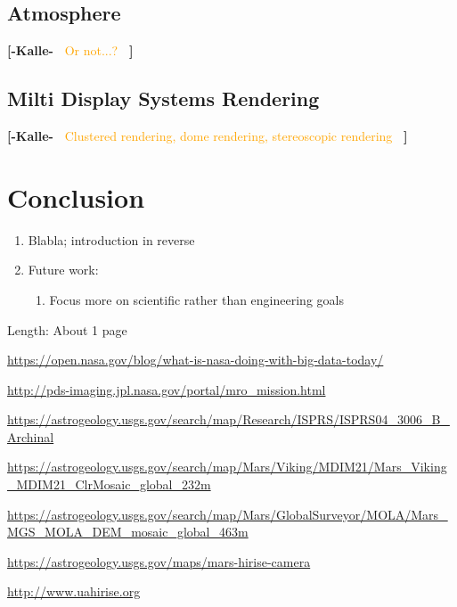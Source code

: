 \documentclass[journal]{vgtc}                %
\newcommand{\kallecomment}[1]{\textbf{[-Kalle-~}
    \textcolor{orange}{#1}
    \textbf{~]}}
\begin{document}
\subsection{Atmosphere}
\kallecomment{Or not...?}

\subsection{Milti Display Systems Rendering}
\kallecomment{Clustered rendering, dome rendering, stereoscopic rendering}

\section{Conclusion} \label{sec:system}
\begin{enumerate}
  \item Blabla; introduction in reverse
  \item Future work:
  \begin{enumerate}
    \item Focus more on scientific rather than engineering goals
  \end{enumerate}
\end{enumerate}
Length: About 1 page


%

%
%
%



\begin{thebibliography}{99}

\url{https://open.nasa.gov/blog/what-is-nasa-doing-with-big-data-today/}

\url{http://pds-imaging.jpl.nasa.gov/portal/mro_mission.html}

\url{https://astrogeology.usgs.gov/search/map/Research/ISPRS/ISPRS04_3006_B_Archinal}

\url{https://astrogeology.usgs.gov/search/map/Mars/Viking/MDIM21/Mars_Viking_MDIM21_ClrMosaic_global_232m}

\url{https://astrogeology.usgs.gov/search/map/Mars/GlobalSurveyor/MOLA/Mars_MGS_MOLA_DEM_mosaic_global_463m}

\url{https://astrogeology.usgs.gov/maps/mars-hirise-camera}

\url{http://www.uahirise.org}

\end{thebibliography}
\end{document}
